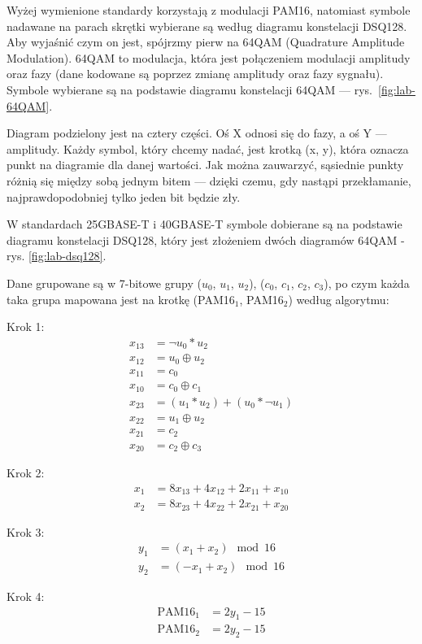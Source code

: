 Wyżej wymienione standardy korzystają z modulacji PAM16, natomiast symbole nadawane na parach skrętki wybierane są według diagramu
konstelacji DSQ128. Aby wyjaśnić czym on jest, spójrzmy pierw na 64QAM (Quadrature Amplitude Modulation). 64QAM to modulacja, która jest
połączeniem modulacji amplitudy oraz fazy (dane kodowane są poprzez zmianę amplitudy oraz fazy sygnału). Symbole wybierane są na podstawie
diagramu konstelacji 64QAM --- rys.~\ref{fig:lab-64QAM}.

Diagram podzielony jest na cztery części. Oś X odnosi się do fazy, a oś Y --- amplitudy. Każdy symbol, który chcemy nadać,
jest krotką (x, y), która oznacza punkt na diagramie dla danej wartości. Jak można zauwarzyć, sąsiednie punkty różnią się
między sobą jednym bitem --- dzięki czemu, gdy nastąpi przekłamanie, najprawdopodobniej tylko jeden bit będzie zły.

W standardach 25GBASE-T i 40GBASE-T symbole dobierane są na podstawie diagramu konstelacji DSQ128, który jest złożeniem dwóch
diagramów 64QAM - rys. \ref{fig:lab-dsq128}.

Dane grupowane są w 7-bitowe grupy ($u_0$, $u_1$, $u_2$), ($c_0$, $c_1$, $c_2$, $c_3$), po czym każda taka grupa mapowana jest na krotkę (PAM16$_1$, PAM16$_2$) według algorytmu:

Krok 1:
\begin{align*}
    x_{13} &= \neg u_0 * u_2 \\
    x_{12} &= u_0 \oplus u_2 \\
    x_{11} &= c_0 \\
    x_{10} &= c_0 \oplus c_1 \\
    x_{23} &= (u_1 * u_2) + (u_0 * \neg u_1) \\
    x_{22} &= u_1 \oplus u_2 \\
    x_{21} &= c_2 \\
    x_{20} &= c_2 \oplus c_3
\end{align*}

Krok 2:
\begin{align*}
    x_1 &= 8x_{13} + 4x_{12} + 2x_{11} + x_{10} \\
    x_2 &= 8x_{23} + 4x_{22} + 2x_{21} + x_{20}
\end{align*}

Krok 3:
\begin{align*}
    y_1 &= (x_1 + x_2) \mod 16 \\
    y_2 &= (-x_1 + x_2) \mod 16
\end{align*}

Krok 4:
\begin{align*}
    \text{PAM16}_1 &= 2y_1 - 15 \\
    \text{PAM16}_2 &= 2y_2 - 15
\end{align*}

